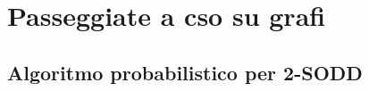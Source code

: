 \documentclass[\main/main.tex]{subfiles}
\begin{document}
\section{Passeggiate a cso su grafi}
\subsection{Algoritmo probabilistico per 2-SODD}
\end{document}
